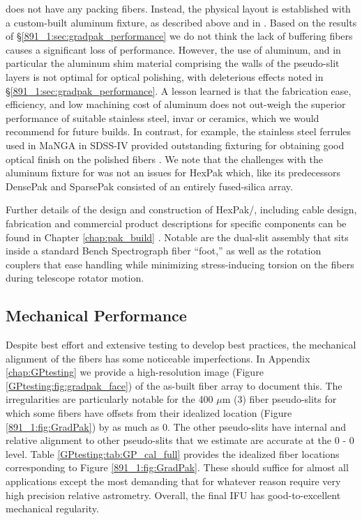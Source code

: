 \GP does not have any packing fibers. Instead, the physical layout is
established with a custom-built aluminum fixture, as described above
and in \citep{Wood12}. Based on the results of
\S\ref{891_1:sec:gradpak_performance} we do not think the lack of
buffering fibers causes a significant loss of performance. However,
the use of aluminum, and in particular the aluminum shim material
comprising the walls of the pseudo-slit layers is not optimal for
optical polishing, with deleterious effects noted in
\S\ref{891_1:sec:gradpak_performance}. A lesson learned is that the
fabrication ease, efficiency, and low machining cost of aluminum does
not out-weigh the superior performance of suitable stainless steel,
invar or ceramics, which we would recommend for future builds. In
contrast, for example, the stainless steel ferrules used in MaNGA in
SDSS-IV \citep{Bundy15} provided outstanding fixturing for obtaining
good optical finish on the polished fibers \citep{Drory15}.  We note
that the challenges with the aluminum fixture for \GP was not an
issues for HexPak which, like its predecessors DensePak
\citep{Barden94} and SparsePak \citep{Bershady04} consisted of an
entirely fused-silica array.

Further details of the design and construction of HexPak/\GP,
including cable design, fabrication and commercial product
descriptions for specific components can be found in Chapter
\ref{chap:pak_build} \citep[a reprint of ][]{Wood12}.  Notable are the
dual-slit assembly that sits inside a standard Bench Spectrograph
fiber ``foot,'' as well as the rotation couplers that ease handling
while minimizing stress-inducing torsion on the fibers during
telescope rotator motion.

\subsection{Mechanical Performance}

Despite best effort and extensive testing to develop best practices,
the mechanical alignment of the \GP fibers has some noticeable
imperfections. In Appendix \ref{chap:GPtesting} we provide a
high-resolution image (Figure \ref{GPtesting:fig:gradpak_face}) of the
as-built fiber array to document this. The irregularities are
particularly notable for the 400 $\mu$m (3) fiber pseudo-slits
for which some fibers have offsets from their idealized location
(Figure \ref{891_1:fig:GradPak}) by as much as 0. The other
pseudo-slits have internal and relative alignment to other
pseudo-slits that we estimate are accurate at the 0 - 0
level. Table \ref{GPtesting:tab:GP_cal_full} provides the idealized
fiber locations corresponding to Figure \ref{891_1:fig:GradPak}. These
should suffice for almost all applications except the most demanding
that for whatever reason require very high precision relative
astrometry. Overall, the final IFU has good-to-excellent mechanical
regularity.

